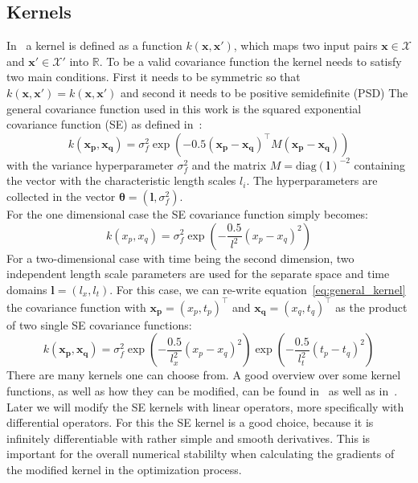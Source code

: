 \documentclass{article}
\begin{document}
\subsection{Kernels} \label{subsec: Kernels}
In~\cite{RasmussenCarlEdward} a kernel is defined as a function
$k(\bm{x},\bm{x'})$, which maps two input pairs $\bm{x} \in \mathcal{X}$ and
$\bm{x'} \in \mathcal{X'}$ into $\mathbb{R}$. To be a valid covariance function
the kernel needs to satisfy two main conditions. First it needs to be symmetric
so that $k(\bm{x,x'}) = k(\bm{x,x'})$ and second it needs to be positive
semidefinite (PSD) The general covariance function used in this work is the
squared exponential covariance function (SE) as defined
in~\cite{RasmussenCarlEdward}:
\begin{equation}
    k(\bm{x_p}, \bm{x_q}) = \sigma_f^2  \exp({-0.5{(\bm{x_p}-\bm{x_q} )}^\intercal M (\bm{x_p}- \bm{x_q})})
\end{equation}
with the variance hyperparameter $\sigma_f^2$ and the matrix $M = {\mathrm{diag}(\bm{l})}^{-2}$ containing the vector with the characteristic length scales $l_i$. The hyperparameters are collected in the vector $\bm{\theta} = (\bm{l},\sigma_f^2)$. \\
For the one dimensional case the SE covariance function simply becomes:
\begin{equation}
    k(x_p, x_q) = \sigma_f^2  \exp\left({-\frac{0.5}{l^2} {(x_p-x_q)}^2}\right)
\end{equation}
For a two-dimensional case with time being the second dimension, two independent length scale parameters are used for the separate space and time domains $\bm{l} = (l_x,l_t)$. For this case, we can re-write equation~\ref{eq:general_kernel} the covariance function with $\bm{x_p} = {(x_p, t_p)}^\intercal$ and  $\bm{x_q} = {(x_q, t_q)}^\intercal$ as the product of two single SE covariance functions:
\begin{equation}
    k(\bm{x_p}, \bm{x_q}) = \sigma_f^2  \exp\left({-\frac{0.5}{l_x^2} {(x_p-x_q)}^2}\right) \exp\left({-\frac{0.5}{l_t^2} {(t_p-t_q)}^2}\right)
\end{equation}
There are many kernels one can choose from. A good overview over some kernel functions, as well as how they can be modified, can be found in~\cite{Duvenaud} as well as in~\cite{görtler2019a}. Later we will modify the SE kernels with linear operators, more specifically with differential operators. For this the SE kernel is a good choice, because it is infinitely differentiable with rather simple and smooth derivatives. This is important for the overall numerical stabililty when calculating the gradients of the modified kernel in the optimization process.\\ 
\end{document}
